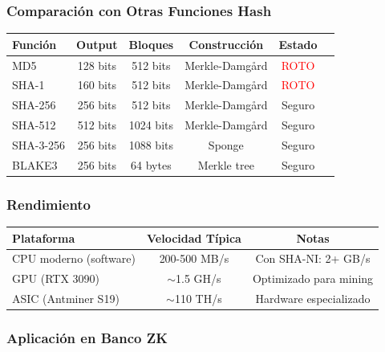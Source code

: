 \documentclass[11pt,a4paper,twoside,openright]{book}
\theoremstyle{definition}
\theoremstyle{plain}
\theoremstyle{remark}
\begin{document}
\subsubsection{Comparación con Otras Funciones Hash}

\begin{center}
\begin{tabular}{lccccc}
\toprule
\textbf{Función} & \textbf{Output} & \textbf{Bloques} & \textbf{Construcción} & \textbf{Estado} \\
\midrule
MD5 & 128 bits & 512 bits & Merkle-Damgård & \textcolor{red}{ROTO} \\
SHA-1 & 160 bits & 512 bits & Merkle-Damgård & \textcolor{red}{ROTO} \\
SHA-256 & 256 bits & 512 bits & Merkle-Damgård & Seguro \\
SHA-512 & 512 bits & 1024 bits & Merkle-Damgård & Seguro \\
SHA-3-256 & 256 bits & 1088 bits & Sponge & Seguro \\
BLAKE3 & 256 bits & 64 bytes & Merkle tree & Seguro \\
\bottomrule
\end{tabular}
\end{center}

\subsubsection{Rendimiento}

\begin{center}
\begin{tabular}{lcc}
\toprule
\textbf{Plataforma} & \textbf{Velocidad Típica} & \textbf{Notas} \\
\midrule
CPU moderno (software) & 200-500 MB/s & Con SHA-NI: 2+ GB/s \\
GPU (RTX 3090) & $\sim$1.5 GH/s & Optimizado para mining \\
ASIC (Antminer S19) & $\sim$110 TH/s & Hardware especializado \\
\bottomrule
\end{tabular}
\end{center}

\subsubsection{Aplicación en Banco ZK}
\end{document}
